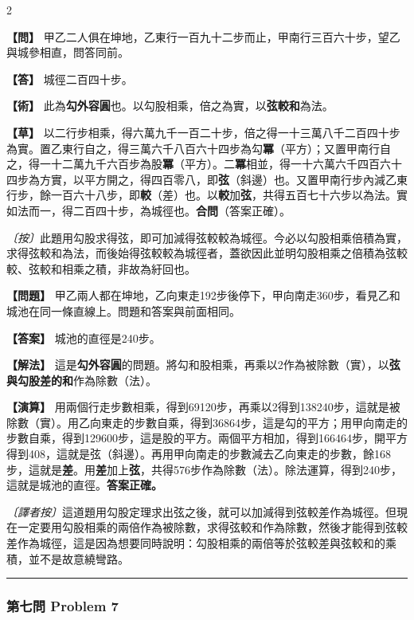 \documentclass[11pt,a4paper]{article}
\newcommand{\wen}[1]{\par\noindent\textbf{\color{problemcolor}【問】} #1\par}
\newcommand{\da}[1]{\par\noindent\textbf{\color{problemcolor}【答】} #1\par}
\newcommand{\shu}[1]{\par\noindent\textbf{\color{problemcolor}【術】} #1\par}
\newcommand{\cao}[1]{\par\noindent\textbf{\color{problemcolor}【草】} #1\par}
\newcommand{\an}[1]{\par\noindent\textit{〔按〕}#1\par}
\newcommand{\wenm}[1]{\par\noindent\textbf{\color{problemcolor}【問題】} #1\par}
\newcommand{\dam}[1]{\par\noindent\textbf{\color{problemcolor}【答案】} #1\par}
\newcommand{\shum}[1]{\par\noindent\textbf{\color{problemcolor}【解法】} #1\par}
\newcommand{\caom}[1]{\par\noindent\textbf{\color{problemcolor}【演算】} #1\par}
\newcommand{\anm}[1]{\par\noindent\textit{〔譯者按〕}#1\par}
\begin{document}
\begin{paracol}{2}
\wen{甲乙二人俱在坤地，乙東行一百九十二步而止，甲南行三百六十步，望乙與城參相直，問答同前。}

\da{城徑二百四十步。}

\shu{此為\textbf{勾外容圓}也。以勾股相乘，倍之為實，以\textbf{弦較和}為法。}

\cao{以二行步相乘，得六萬九千一百二十步，倍之得一十三萬八千二百四十步為實。置乙東行自之，得三萬六千八百六十四步為勾\textbf{冪}（平方）；又置甲南行自之，得一十二萬九千六百步為股\textbf{冪}（平方）。二\textbf{冪}相並，得一十六萬六千四百六十四步為方實，以平方開之，得四百零八，即\textbf{弦}（斜邊）也。又置甲南行步內減乙東行步，餘一百六十八步，即\textbf{較}（差）也。以\textbf{較}加\textbf{弦}，共得五百七十六步以為法。實如法而一，得二百四十步，為城徑也。\textbf{合問}（答案正確）。}

\an{此題用勾股求得弦，即可加減得弦較較為城徑。今必以勾股相乘倍積為實，求得弦較和為法，而後始得弦較較為城徑者，蓋欲因此並明勾股相乘之倍積為弦較較、弦較和相乘之積，非故為紆回也。}

\switchcolumn
\wenm{甲乙兩人都在坤地，乙向東走192步後停下，甲向南走360步，看見乙和城池在同一條直線上。問題和答案與前面相同。}

\dam{城池的直徑是240步。}

\shum{這是\textbf{勾外容圓}的問題。將勾和股相乘，再乘以2作為被除數（實），以\textbf{弦與勾股差的和}作為除數（法）。}

\caom{用兩個行走步數相乘，得到69120步，再乘以2得到138240步，這就是被除數（實）。用乙向東走的步數自乘，得到36864步，這是勾的平方；用甲向南走的步數自乘，得到129600步，這是股的平方。兩個平方相加，得到166464步，開平方得到408，這就是弦（斜邊）。再用甲向南走的步數減去乙向東走的步數，餘168步，這就是\textbf{差}。用\textbf{差}加上\textbf{弦}，共得576步作為除數（法）。除法運算，得到240步，這就是城池的直徑。\textbf{答案正確。}}

\anm{這道題用勾股定理求出弦之後，就可以加減得到弦較差作為城徑。但現在一定要用勾股相乘的兩倍作為被除數，求得弦較和作為除數，然後才能得到弦較差作為城徑，這是因為想要同時說明：勾股相乘的兩倍等於弦較差與弦較和的乘積，並不是故意繞彎路。}
\end{paracol}

\vspace{0.5cm}
\noindent\textcolor{rulecolor}{\rule{\textwidth}{0.4pt}}

\subsubsection*{第七問 \quad Problem 7}
\end{document}
